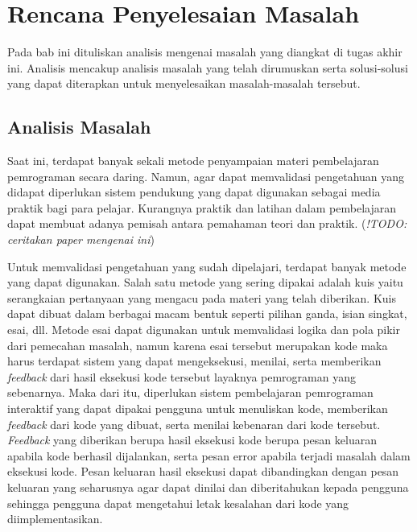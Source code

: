 \chapter{Rencana Penyelesaian Masalah}

Pada bab ini dituliskan analisis mengenai masalah yang diangkat di tugas akhir ini. Analisis mencakup analisis masalah yang telah dirumuskan serta solusi-solusi yang dapat diterapkan untuk menyelesaikan masalah-masalah tersebut.

\section{Analisis Masalah}
Saat ini, terdapat banyak sekali metode penyampaian materi pembelajaran pemrograman secara daring. Namun, agar dapat memvalidasi pengetahuan yang didapat diperlukan sistem pendukung yang dapat digunakan sebagai media praktik bagi para pelajar. Kurangnya praktik dan latihan dalam pembelajaran dapat membuat adanya pemisah antara pemahaman teori dan praktik. (\textit{!TODO: ceritakan paper mengenai ini})

Untuk memvalidasi pengetahuan yang sudah dipelajari, terdapat banyak metode yang dapat digunakan. Salah satu metode yang sering dipakai adalah kuis yaitu serangkaian pertanyaan yang mengacu pada materi yang telah diberikan. Kuis dapat dibuat dalam berbagai macam bentuk seperti pilihan ganda, isian singkat, esai, dll. Metode esai dapat digunakan untuk memvalidasi logika dan pola pikir dari pemecahan masalah, namun karena esai tersebut merupakan kode maka harus terdapat sistem yang dapat mengeksekusi, menilai, serta memberikan \textit{feedback} dari hasil eksekusi kode tersebut layaknya pemrograman yang sebenarnya. Maka dari itu, diperlukan sistem pembelajaran pemrograman interaktif yang dapat dipakai pengguna untuk menuliskan kode, memberikan \textit{feedback} dari kode yang dibuat, serta menilai kebenaran dari kode tersebut. \textit{Feedback} yang diberikan berupa hasil eksekusi kode berupa pesan keluaran apabila kode berhasil dijalankan, serta pesan error apabila terjadi masalah dalam eksekusi kode. Pesan keluaran hasil eksekusi dapat dibandingkan dengan pesan keluaran yang seharusnya agar dapat dinilai dan diberitahukan kepada pengguna sehingga pengguna dapat mengetahui letak kesalahan dari kode yang diimplementasikan.

